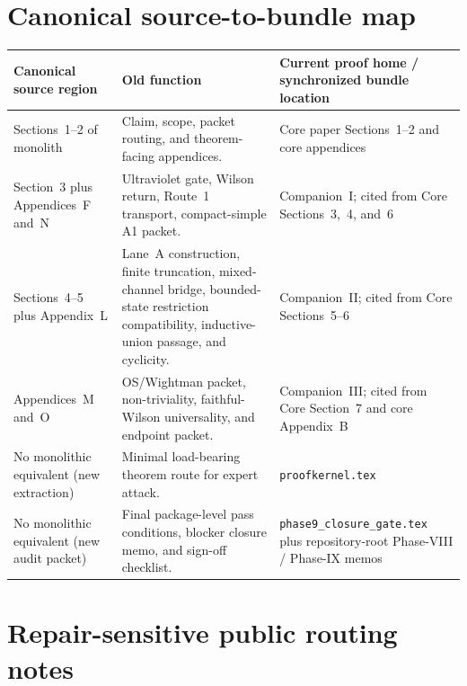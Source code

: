 \documentclass[11pt]{article}
\begin{document}
\section{Canonical source-to-bundle map}

\begin{center}
\small
\begin{tabularx}{\linewidth}{@{}L{4.2cm}Y Y@{}}
\toprule
\textbf{Canonical source region} & \textbf{Old function} & \textbf{Current proof home / synchronized bundle location}\\
\midrule
Sections~1--2 of monolith & Claim, scope, packet routing, and theorem-facing appendices. & Core paper Sections~1--2 and core appendices\\
Section~3 plus Appendices~F and~N & Ultraviolet gate, Wilson return, Route~1 transport, compact-simple A1 packet. & Companion~I; cited from Core Sections~3,~4, and~6\\
Sections~4--5 plus Appendix~L & Lane~A construction, finite truncation, mixed-channel bridge, bounded-state restriction compatibility, inductive-union passage, and cyclicity. & Companion~II; cited from Core Sections~5--6\\
Appendices~M and~O & OS/Wightman packet, non-triviality, faithful-Wilson universality, and endpoint packet. & Companion~III; cited from Core Section~7 and core Appendix~B\\
No monolithic equivalent (new extraction) & Minimal load-bearing theorem route for expert attack. & \texttt{proofkernel.tex}\\
No monolithic equivalent (new audit packet) & Final package-level pass conditions, blocker closure memo, and sign-off checklist. & \texttt{phase9\_closure\_gate.tex} plus repository-root Phase-VIII / Phase-IX memos\\
\bottomrule
\end{tabularx}
\end{center}

\section{Repair-sensitive public routing notes}
\end{document}
